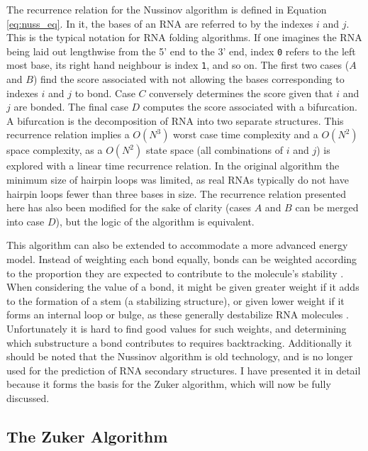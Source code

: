 \documentclass{cshonours}
\begin{document}
The recurrence relation for the Nussinov algorithm is defined in Equation \ref{eq:nuss_eq}. In it, the bases of an RNA are referred to by the indexes $i$ and $j$. This is the typical notation for RNA folding algorithms. If one imagines the RNA being laid out lengthwise from the 5' end to the 3' end, index \texttt{0} refers to the left most base, its right hand neighbour is index \texttt{1}, and so on. The first two cases ($A$ and $B$) find the score associated with not allowing the bases corresponding to indexes $i$ and $j$ to bond. Case $C$ conversely determines the score given that $i$ and $j$ are bonded. The final case $D$ computes the score associated with a bifurcation. A bifurcation is the decomposition of RNA into two separate structures. This recurrence relation implies a $O(N^3)$
worst case time complexity and a $O(N^2)$ space complexity, as a $O(N^2)$ state space (all combinations of $i$ and $j$) is explored
with a linear time recurrence relation. In the original algorithm the minimum size of hairpin loops was limited, as real RNAs typically do not have hairpin loops fewer than three bases in size. The recurrence relation presented here has also been modified for the sake of clarity (cases $A$ and $B$ can be merged into case $D$), but the logic of the algorithm is equivalent.



This algorithm can also be extended to accommodate a more advanced energy
model. Instead of weighting each bond equally, bonds can be weighted
according to the proportion they are expected to contribute to the molecule's
stability \cite{nussinov1980fast}. When considering the value of a bond, it might be given greater
weight if it adds to the formation of a stem (a stabilizing structure), or
given lower weight if it forms an internal loop or bulge, as these generally
destabilize RNA molecules \cite{nussinov1980fast}. Unfortunately it is hard to find good values for
such weights, and determining which substructure a bond contributes to requires
backtracking. Additionally it should be noted that the Nussinov algorithm is old technology, and is no longer used for the prediction of RNA secondary structures. I have presented it in detail because it forms the basis for the Zuker algorithm, which will now be fully discussed.


\subsection{The Zuker Algorithm}
\end{document}
